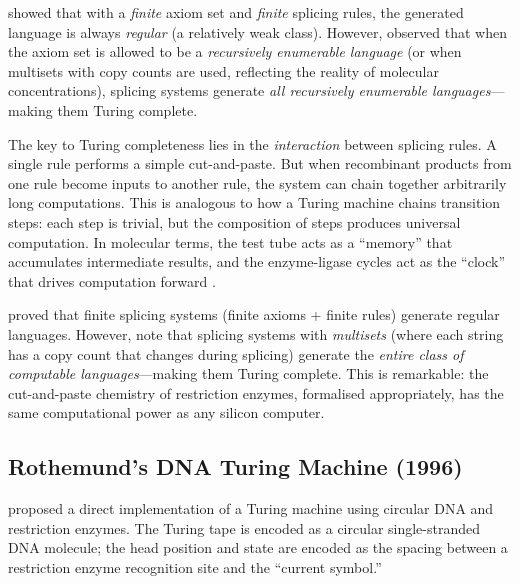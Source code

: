 \citet{head1987} showed that with a \emph{finite} axiom set and \emph{finite} splicing rules, the generated language is always \emph{regular} (a relatively weak class).  However, \citet{daleykari2002} observed that when the axiom set is allowed to be a \emph{recursively enumerable language} (or when multisets with copy counts are used, reflecting the reality of molecular concentrations), splicing systems generate \emph{all recursively enumerable languages}---making them Turing complete.

\begin{keyinsight}
The key to Turing completeness lies in the \emph{interaction} between splicing rules.  A single rule performs a simple cut-and-paste.  But when recombinant products from one rule become inputs to another rule, the system can chain together arbitrarily long computations.  This is analogous to how a Turing machine chains transition steps: each step is trivial, but the composition of steps produces universal computation.  In molecular terms, the test tube acts as a ``memory'' that accumulates intermediate results, and the enzyme-ligase cycles act as the ``clock'' that drives computation forward \citep{head1987, daleykari2002}.
\end{keyinsight}

\begin{keyinsight}
\citet{head1987} proved that finite splicing systems (finite axioms + finite rules) generate regular languages.  However, \citet{daleykari2002} note that splicing systems with \emph{multisets} (where each string has a copy count that changes during splicing) generate the \emph{entire class of computable languages}---making them Turing complete.  This is remarkable: the cut-and-paste chemistry of restriction enzymes, formalised appropriately, has the same computational power as any silicon computer.
\end{keyinsight}

\subsection{Rothemund's DNA Turing Machine (1996)}

\citet{rothemund1996turing} proposed a direct implementation of a Turing machine using circular DNA and restriction enzymes.  The Turing tape is encoded as a circular single-stranded DNA molecule; the head position and state are encoded as the spacing between a restriction enzyme recognition site and the ``current symbol.''

